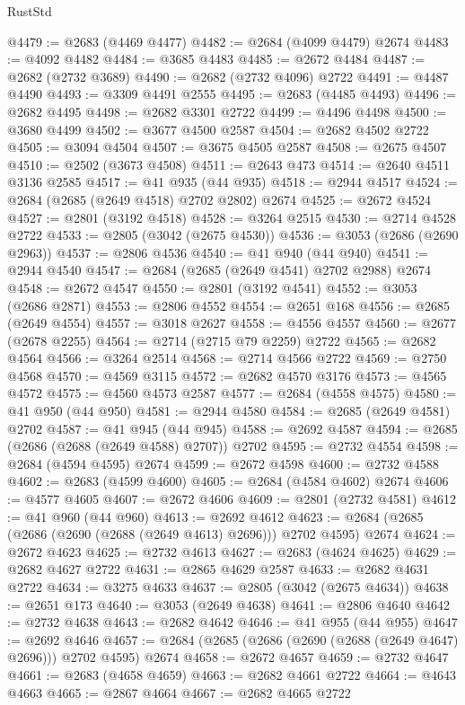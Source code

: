 \begin{lexlean}{RustStd}
\begin{coremodule}
@4479 := @2683 (@4469 @4477)
@4482 := @2684 (@4099 @4479) @2674
@4483 := @4092 @4482
@4484 := @3685 @4483
@4485 := @2672 @4484
@4487 := @2682 (@2732 @3689)
@4490 := @2682 (@2732 @4096) @2722
@4491 := @4487 @4490
@4493 := @3309 @4491 @2555
@4495 := @2683 (@4485 @4493)
@4496 := @2682 @4495
@4498 := @2682 @3301 @2722
@4499 := @4496 @4498
@4500 := @3680 @4499
@4502 := @3677 @4500 @2587
@4504 := @2682 @4502 @2722
@4505 := @3094 @4504
@4507 := @3675 @4505 @2587
@4508 := @2675 @4507
@4510 := @2502 (@3673 @4508)
@4511 := @2643 @473
@4514 := @2640 @4511 @3136 @2585
@4517 := @41 @935 (@44 @935)
@4518 := @2944 @4517
@4524 := @2684 (@2685 (@2649 @4518) @2702 @2802) @2674
@4525 := @2672 @4524
@4527 := @2801 (@3192 @4518)
@4528 := @3264 @2515
@4530 := @2714 @4528 @2722
@4533 := @2805 (@3042 (@2675 @4530))
@4536 := @3053 (@2686 (@2690 @2963))
@4537 := @2806 @4536
@4540 := @41 @940 (@44 @940)
@4541 := @2944 @4540
@4547 := @2684 (@2685 (@2649 @4541) @2702 @2988) @2674
@4548 := @2672 @4547
@4550 := @2801 (@3192 @4541)
@4552 := @3053 (@2686 @2871)
@4553 := @2806 @4552
@4554 := @2651 @168
@4556 := @2685 (@2649 @4554)
@4557 := @3018 @2627
@4558 := @4556 @4557
@4560 := @2677 (@2678 @2255)
@4564 := @2714 (@2715 @79 @2259) @2722
@4565 := @2682 @4564
@4566 := @3264 @2514
@4568 := @2714 @4566 @2722
@4569 := @2750 @4568
@4570 := @4569 @3115
@4572 := @2682 @4570 @3176
@4573 := @4565 @4572
@4575 := @4560 @4573 @2587
@4577 := @2684 (@4558 @4575)
@4580 := @41 @950 (@44 @950)
@4581 := @2944 @4580
@4584 := @2685 (@2649 @4581) @2702
@4587 := @41 @945 (@44 @945)
@4588 := @2692 @4587
@4594 := @2685 (@2686 (@2688 (@2649 @4588) @2707)) @2702
@4595 := @2732 @4554
@4598 := @2684 (@4594 @4595) @2674
@4599 := @2672 @4598
@4600 := @2732 @4588
@4602 := @2683 (@4599 @4600)
@4605 := @2684 (@4584 @4602) @2674
@4606 := @4577 @4605
@4607 := @2672 @4606
@4609 := @2801 (@2732 @4581)
@4612 := @41 @960 (@44 @960)
@4613 := @2692 @4612
@4623 := @2684 (@2685 (@2686 (@2690 (@2688 (@2649 @4613) @2696))) @2702 @4595) @2674
@4624 := @2672 @4623
@4625 := @2732 @4613
@4627 := @2683 (@4624 @4625)
@4629 := @2682 @4627 @2722
@4631 := @2865 @4629 @2587
@4633 := @2682 @4631 @2722
@4634 := @3275 @4633
@4637 := @2805 (@3042 (@2675 @4634))
@4638 := @2651 @173
@4640 := @3053 (@2649 @4638)
@4641 := @2806 @4640
@4642 := @2732 @4638
@4643 := @2682 @4642
@4646 := @41 @955 (@44 @955)
@4647 := @2692 @4646
@4657 := @2684 (@2685 (@2686 (@2690 (@2688 (@2649 @4647) @2696))) @2702 @4595) @2674
@4658 := @2672 @4657
@4659 := @2732 @4647
@4661 := @2683 (@4658 @4659)
@4663 := @2682 @4661 @2722
@4664 := @4643 @4663
@4665 := @2867 @4664
@4667 := @2682 @4665 @2722

\end{coremodule}
\end{lexlean}
